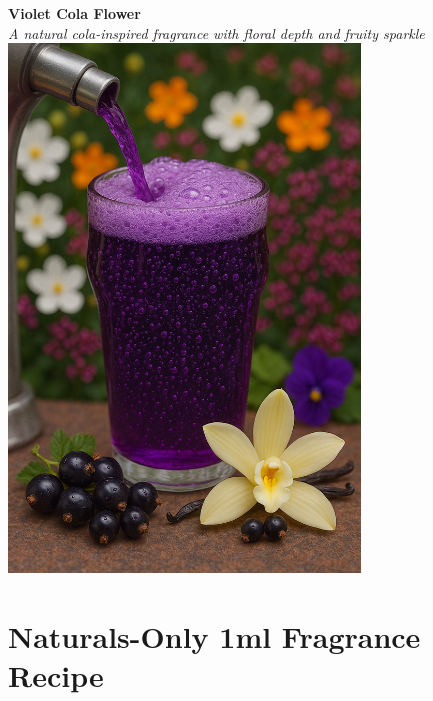 \documentclass{article}
\begin{document}
\begin{center}
\textcolor{violetPurple}{\LARGE\textbf{Violet Cola Flower}}\\[0.5cm]
\textcolor{colaBrown}{\large\textit{A natural cola-inspired fragrance with floral depth and fruity sparkle}}\\[0.5cm]

\includegraphics[width=0.7\textwidth]{violet_cola.png}\\[0.5cm]
\end{center}

\section*{Naturals-Only 1ml Fragrance Recipe}
\end{document}
